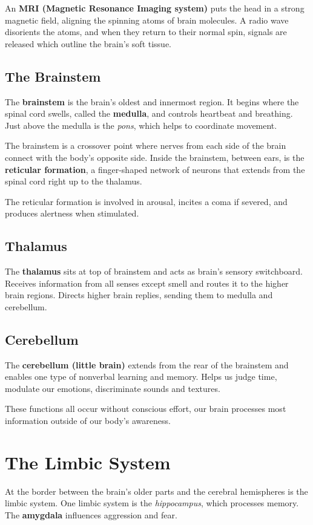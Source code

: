 \documentclass[12pt]{article}
\begin{document}
An \textbf{MRI (Magnetic Resonance Imaging system)} puts the head in a strong magnetic field, aligning the spinning atoms of brain molecules. A radio wave disorients the atoms, and when they return to their normal spin, signals are released which outline the brain's soft tissue.

\subsection*{The Brainstem}
The \textbf{brainstem} is the brain's oldest and innermost region. It begins where the spinal cord swells, called the \textbf{medulla}, and controls heartbeat and breathing. Just above the medulla is the \textit{pons}, which helps to coordinate movement. 

The brainstem is a crossover point where nerves from each side of the brain connect with the body's opposite side. Inside the brainstem, between ears, is the \textbf{reticular formation}, a finger-shaped network of neurons that extends from the spinal cord right up to the thalamus. 

The reticular formation is involved in arousal, incites a coma if severed, and produces alertness when stimulated.

\subsection*{Thalamus}
The {\bf thalamus} sits at top of brainstem and acts as brain's sensory switchboard. Receives information from all senses except smell and routes it to the higher brain regions. Directs higher brain replies, sending them to medulla and cerebellum.

\subsection*{Cerebellum}
The {\bf cerebellum (little brain)} extends from the rear of the brainstem and enables one type of nonverbal learning and memory. Helps us judge time, modulate our emotions, discriminate sounds and textures.

These functions all occur without conscious effort, our brain processes most information outside of our body's awareness.

\section*{The Limbic System}
At the border between the brain's older parts and the cerebral hemispheres is the limbic system. One limbic system is the \textit{hippocampus}, which processes memory. The {\bf amygdala} influences aggression and fear.
\end{document}
